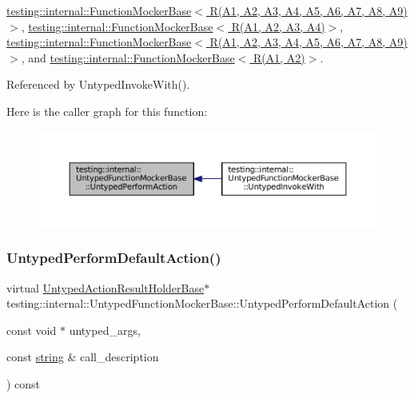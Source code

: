 \hyperlink{classtesting_1_1internal_1_1FunctionMockerBase_aebdb11fe4ea9e9f3984cbcd58c6f6cf9}{testing\+::internal\+::\+Function\+Mocker\+Base$<$ R(\+A1, A2, A3, A4, A5, A6, A7, A8, A9)$>$}, \hyperlink{classtesting_1_1internal_1_1FunctionMockerBase_aebdb11fe4ea9e9f3984cbcd58c6f6cf9}{testing\+::internal\+::\+Function\+Mocker\+Base$<$ R(\+A1, A2, A3, A4)$>$}, \hyperlink{classtesting_1_1internal_1_1FunctionMockerBase_aebdb11fe4ea9e9f3984cbcd58c6f6cf9}{testing\+::internal\+::\+Function\+Mocker\+Base$<$ R(\+A1, A2, A3, A4, A5, A6, A7, A8, A9) $>$}, and \hyperlink{classtesting_1_1internal_1_1FunctionMockerBase_aebdb11fe4ea9e9f3984cbcd58c6f6cf9}{testing\+::internal\+::\+Function\+Mocker\+Base$<$ R(\+A1, A2)$>$}.



Referenced by Untyped\+Invoke\+With().

Here is the caller graph for this function\+:
\nopagebreak
\begin{figure}[H]
\begin{center}
\leavevmode
\includegraphics[width=350pt]{classtesting_1_1internal_1_1UntypedFunctionMockerBase_ada5a72303863d0aa655b66338b8efea5_icgraph}
\end{center}
\end{figure}
\mbox{\label{classtesting_1_1internal_1_1UntypedFunctionMockerBase_a2cb149456cd559d5b0615f2310b235e3}} 
\subsubsection{\texorpdfstring{Untyped\+Perform\+Default\+Action()}{UntypedPerformDefaultAction()}}
{\footnotesize\ttfamily virtual \hyperlink{classtesting_1_1internal_1_1UntypedActionResultHolderBase}{Untyped\+Action\+Result\+Holder\+Base}$\ast$ testing\+::internal\+::\+Untyped\+Function\+Mocker\+Base\+::\+Untyped\+Perform\+Default\+Action (\begin{DoxyParamCaption}\item[{const void $\ast$}]{untyped\+\_\+args,  }\item[{const \hyperlink{namespacetesting_1_1internal_a8e8ff5b11e64078831112677156cb111}{string} \&}]{call\+\_\+description }\end{DoxyParamCaption}) const\hspace{0.3cm}{\ttfamily [pure virtual]}}



